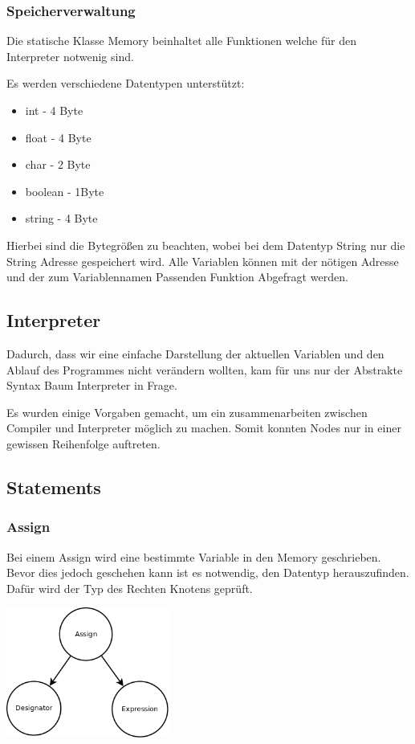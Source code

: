 \subsubsection{Speicherverwaltung}
Die statische Klasse Memory beinhaltet alle Funktionen welche für den Interpreter notwenig sind.

Es werden verschiedene Datentypen unterstützt:
\begin{itemize}
 \item int - 4 Byte
 \item float - 4 Byte
 \item char - 2 Byte 
 \item boolean - 1Byte
 \item string - 4 Byte
\end{itemize}

Hierbei sind die Bytegrößen zu beachten, wobei bei dem Datentyp String nur die String Adresse gespeichert wird. Alle Variablen können
mit der nötigen Adresse und der zum Variablennamen Passenden Funktion Abgefragt werden.

\subsection{Interpreter}
Dadurch, dass wir eine einfache Darstellung der aktuellen Variablen und den Ablauf des Programmes nicht verändern wollten, kam für 
uns nur der Abstrakte Syntax Baum Interpreter in Frage.

Es wurden einige Vorgaben gemacht, um ein zusammenarbeiten zwischen Compiler und Interpreter möglich zu machen. Somit konnten Nodes
nur in einer gewissen Reihenfolge auftreten.
\subsection{Statements}
\subsubsection{Assign}
Bei einem Assign wird eine bestimmte Variable in den Memory geschrieben. Bevor dies jedoch geschehen kann ist es notwendig,
den Datentyp herauszufinden. Dafür wird der Typ des Rechten Knotens geprüft.

\includegraphics[width=0.4\textwidth]{./media/images/interpreter/syntaxbaum/statements/assign.png}

